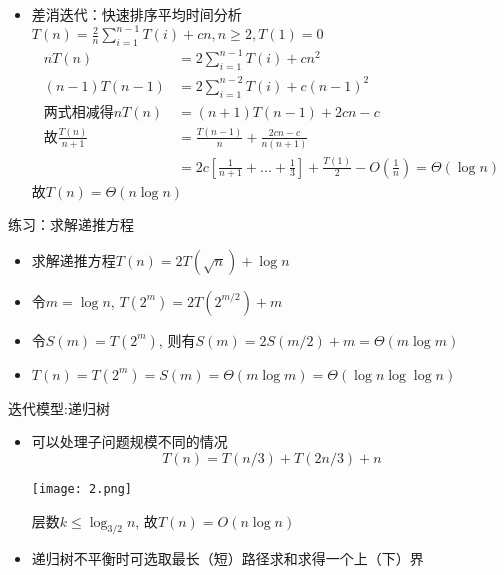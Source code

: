 \documentclass{ctexbeamer}
\begin{document}
    \begin{frame}
        \begin{itemize}
            \item 差消迭代：快速排序平均时间分析\\
            $T(n)=\frac{2}{n}\sum\limits_{i=1}^{n-1}T(i)+cn, n\geq 2, T(1) = 0$
            \begin{align*}
            nT(n)&=2\sum_{i=1}^{n-1}T(i)+cn^2\\
            (n-1)T(n-1)&=2\sum_{i=1}^{n-2}T(i)+c(n-1)^2\\
            \text{两式相减得} nT(n)&=(n+1)T(n-1)+2cn-c\\
            \text{故} \frac{T(n)}{n+1}&=\frac{T(n-1)}{n}+\frac{2cn-c}{n(n+1)}\\
            &=2c[\frac{1}{n+1}+...+\frac{1}{3}]+\frac{T(1)}{2}-O(\frac{1}{n})=\Theta(\log n)
            \end{align*}
            故$T(n)=\Theta(n\log n)$
        \end{itemize}
    \end{frame}

    \begin{frame}{练习：求解递推方程}
    \begin{itemize}
        \setlength{\itemsep}{2em}
    \item 
    求解递推方程$T(n)=2T(\sqrt{n})+\log n$
    \pause
    \item 令$m=\log n$, $T(2^m)=2T(2^{m/2})+m$
    \item 令$S(m)=T(2^m)$, 则有$S(m)=2S(m/2)+m=\Theta(m\log m)$
    \item $T(n)=T(2^m)=S(m)=\Theta(m\log m) = \Theta(\log n \log\log n)$
    \end{itemize}
    \end{frame}

    \begin{frame}{迭代模型:递归树}
    \begin{itemize}
    \item 可以处理子问题规模不同的情况
    $$T(n)=T(n/3)+T(2n/3)+n$$
    \begin{center}\texttt{[image: 2.png]}\end{center}
    层数$k \leq \log_{3/2}n$, 故$T(n)=O(n\log n)$
    \item 递归树不平衡时可选取最长（短）路径求和求得一个上（下）界
    \end{itemize}
    \end{frame}
    
\end{document}
